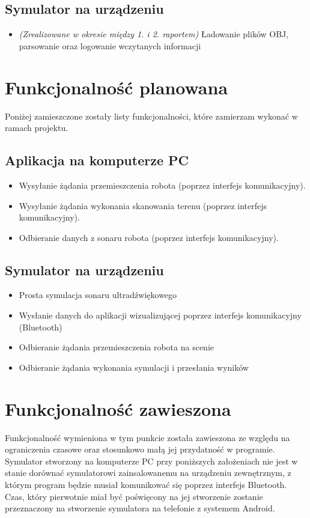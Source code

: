 \documentclass[a4paper,12pt]{article}
\begin{document}
\subsection{Symulator na urządzeniu}
\begin{itemize}
\item \textit{ (Zrealizowane w okresie między 1. i 2. raportem) } Ładowanie plików OBJ, parsowanie oraz logowanie wczytanych informacji
\end{itemize}


\section{Funkcjonalność planowana}
Poniżej zamieszczone zostały listy funkcjonalności, które zamierzam wykonać w ramach projektu. 
\subsection{Aplikacja na komputerze PC}
\begin{itemize}
\item Wysyłanie żądania przemieszczenia robota (poprzez interfejs komunikacyjny).
\item Wysyłanie żądania wykonania skanowania terenu (poprzez interfejs komunikacyjny).
\item Odbieranie danych z sonaru robota (poprzez interfejs komunikacyjny).
\end{itemize}

\subsection{Symulator na urządzeniu}
\begin{itemize}
\item Prosta symulacja sonaru ultradźwiękowego
\item Wysłanie danych do aplikacji wizualizującej poprzez interfejs komunikacyjny (Bluetooth)
\item Odbieranie żądania przemieszczenia robota na scenie
\item Odbieranie żądania wykonania symulacji i przesłania wyników
\end{itemize}

\section{Funkcjonalność zawieszona}
Funkcjonalność wymieniona w tym punkcie została zawieszona ze względu na ograniczenia czasowe oraz stosunkowo małą jej przydatność w programie.
Symulator stworzony na komputerze PC przy poniższych założeniach nie jest w stanie dorównać symulatorowi zainsalowanemu na urządzeniu zewnętrznym, z którym
program będzie musiał komunikować się poprzez interfejs Bluetooth. Czas, który pierwotnie miał być poświęcony na jej stworzenie zostanie przeznaczony
na stworzenie symulatora na telefonie z systemem Android.
\end{document}
